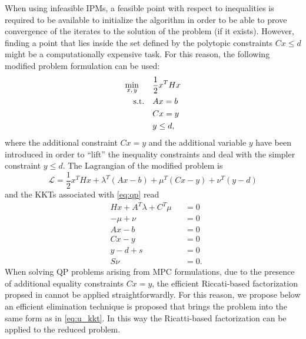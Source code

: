\documentclass{article}
\begin{document}
When using infeasible IPMs, a feasible point with respect to inequalities is required to be available to initialize the algorithm in order to be able to prove convergence of the iterates to the solution of the problem (if it exists). However, finding a point that lies inside the set defined by the polytopic constraints $Cx \leq d$ might be a computationally expensive task. For this reason, the following modified problem formulation can be used:
\begin{equation}\label{eq:qp}
\begin{aligned}
&\underset{\begin{subarray}{c}
	x,\,y \\
	\end{subarray}}{\min}	&&\frac{1}{2}x^THx\\
&\quad \text{s.t.} 		   	&&Ax  = b\\
& 						&&Cx = y \\
& 						&&y \leq d,
\end{aligned}
\end{equation}
where the additional constraint $Cx = y$ and the additional variable $y$ have been introduced in order to ``lift'' the inequality constraints and deal with the simpler constraint $y \leq d$. The Lagrangian of the modified problem is
\begin{equation}
\mathcal{L} = \frac{1}{2}x^THx + \lambda^T(Ax - b) + \mu^T(Cx - y) + \nu^T(y - d)
\end{equation}
and the KKTs associated with \eqref{eq:qp} read 
\begin{equation}\label{eq:kkt}
\begin{aligned}
&Hx + A^T\lambda + C^T\mu &&= 0 \\
&-\mu + \nu &&= 0 \\
&Ax - b 								&&= 0 \\
&Cx - y								&&= 0 \\
&y - d + s									&&=0 \\
&S\nu &&=0.
\end{aligned}
\end{equation} 
When solving QP problems arising from MPC formulations, due to the presence of additional equality constraints $Cx = y$, the efficient Riccati-based factorization propsed in \cite{Frison2013} cannot be applied straightforwardly. For this reason, we propose below an efficient elimination technique is proposed that brings the problem into the same form as in \eqref{eq:u_kkt}. In this way the Ricatti-based factorization can be applied to the reduced problem.
\end{document}
